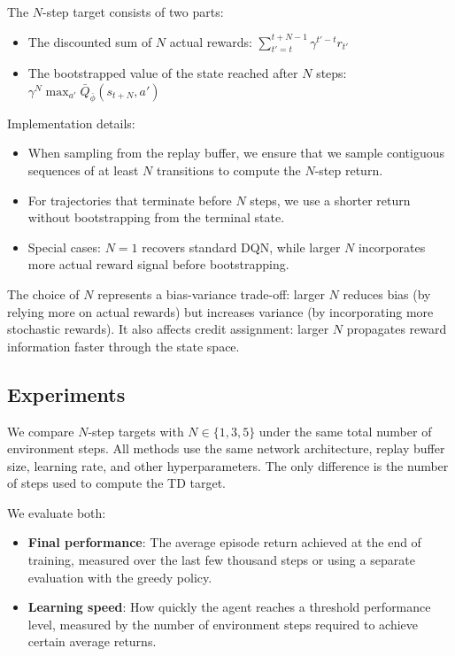 \documentclass[11pt, a4paper, oneside]{memoir}
\begin{document}
The $N$-step target consists of two parts:
\begin{itemize}
\item The discounted sum of $N$ actual rewards: $\sum_{t'=t}^{t+N-1} \gamma^{t'-t} r_{t'}$
\item The bootstrapped value of the state reached after $N$ steps: $\gamma^N \max_{a'} \bar{Q}_{\bar{\phi}}(s_{t+N}, a')$
\end{itemize}

Implementation details:
\begin{itemize}
\item When sampling from the replay buffer, we ensure that we sample contiguous sequences of at least $N$ transitions to compute the $N$-step return.
\item For trajectories that terminate before $N$ steps, we use a shorter return without bootstrapping from the terminal state.
\item Special cases: $N=1$ recovers standard DQN, while larger $N$ incorporates more actual reward signal before bootstrapping.
\end{itemize}

The choice of $N$ represents a bias-variance trade-off: larger $N$ reduces bias (by relying more on actual rewards) but increases variance (by incorporating more stochastic rewards). It also affects credit assignment: larger $N$ propagates reward information faster through the state space.

\subsection{Experiments}

We compare $N$-step targets with $N \in \{1, 3, 5\}$ under the same total number of environment steps. All methods use the same network architecture, replay buffer size, learning rate, and other hyperparameters. The only difference is the number of steps used to compute the TD target.

We evaluate both:
\begin{itemize}
\item \textbf{Final performance}: The average episode return achieved at the end of training, measured over the last few thousand steps or using a separate evaluation with the greedy policy.
\item \textbf{Learning speed}: How quickly the agent reaches a threshold performance level, measured by the number of environment steps required to achieve certain average returns.
\end{itemize}
\end{document}
